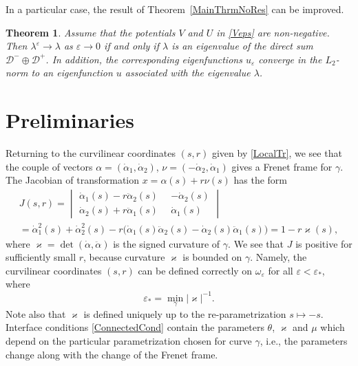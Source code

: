 \documentclass[reqno]{amsart}
\theoremstyle{plain}
\newtheorem{thm}{Theorem}
\numberwithin{equation}{section}
\renewcommand{\kappa}{\varkappa}
\newcommand{\eps}{\varepsilon}
\newcommand{\lme}{\lambda^\eps}
\begin{document}
In a particular case, the result of Theorem~\ref{MainThrmNoRes} can be improved.

\begin{thm}\label{MainThrmVUPos}
Assume that the potentials $V$ and $U$ in \eqref{Veps} are non-negative.
Then $\lme \to \lambda$  as $\eps\to 0$ if and only if $\lambda$ is an eigenvalue of the direct sum $\mathcal{D}^-\oplus\mathcal{D}^+$. In addition,  the corresponding eigenfunctions $u_\eps$ converge in the $L_2$-norm to an eigenfunction $u$ associated with the eigenvalue $\lambda$.
\end{thm}









\section{Preliminaries}
Returning  to the curvilinear coordinates $(s,r)$ given by \eqref{LocalTr},
we see that the couple of vectors
$ \alpha=(\dot{\alpha}_1, \dot{\alpha}_2)$, $\nu=(-\dot{\alpha}_2, \dot{\alpha}_1)$
gives a Frenet frame for $\gamma$.
The Jacobian of transformation $x=\alpha(s)+r\nu(s)$ has the form
\begin{multline*}
J(s,r)=
\begin{vmatrix}
  \dot{\alpha}_1(s)-r\ddot{\alpha}_2(s)& -\dot{\alpha}_2(s)\\
          \dot{\alpha}_2(s)+r\ddot{\alpha}_1(s)\phantom{0} & \dot{\alpha}_1(s)
\end{vmatrix}
\\
=\dot{\alpha}_1^2(s)+\dot{\alpha}_2^2(s)
-r\big(\dot{\alpha}_1(s)\ddot{\alpha}_2(s)-
  \dot{\alpha}_2(s)\ddot{\alpha}_1(s)\big)=1-r \kappa(s),
\end{multline*}
where $\kappa=\det(\dot{\alpha},\ddot{\alpha})$ is the signed curvature of $\gamma$.
We see that $J$ is positive for sufficiently small $r$, because  curvature $\kappa$  is  bounded on $\gamma$.
Namely, the curvilinear coordinates $(s,r)$ can be defined correctly on  $\omega_\eps$ for all $\eps<\eps_*$, where
\begin{equation}\label{EpsStar}
	\eps_*=\min_{\gamma}|\kappa|^{-1}.
\end{equation}
Note also that $\kappa$ is defined uniquely up to the re-parametrization $s\mapsto-s$.
Interface conditions \eqref{ConnectedCond} contain the parameters $\theta$, $\kappa$ and $\mu$ which depend on the particular parametrization chosen for curve $\gamma$, i.e., the parameters change along with the change of the Frenet frame.
\end{document}
